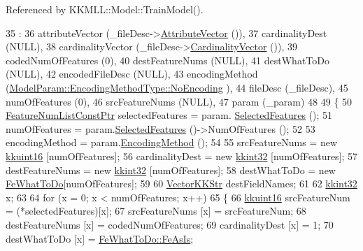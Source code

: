 Referenced by K\+K\+M\+L\+L\+::\+Model\+::\+Train\+Model().


\begin{DoxyCode}
35                                    :
36     attributeVector     (\_fileDesc->\hyperlink{class_k_k_m_l_l_1_1_file_desc_a6dc24b4d315f0c314a4c735d0165798b}{AttributeVector} ()),
37     cardinalityDest     (NULL),
38     cardinalityVector   (\_fileDesc->\hyperlink{class_k_k_m_l_l_1_1_file_desc_a1220ac7417528c460b5c9041275e4c7f}{CardinalityVector} ()),
39     codedNumOfFeatures  (0),
40     destFeatureNums     (NULL),
41     destWhatToDo        (NULL),
42     encodedFileDesc     (NULL),
43     encodingMethod      (\hyperlink{class_k_k_m_l_l_1_1_model_param_a09e49f936f411dba6f08bdaf8d6b4a98a3f6e102acead54bbbf4c704dd88fb94b}{ModelParam::EncodingMethodType::NoEncoding}
      ),
44     fileDesc            (\_fileDesc),
45     numOfFeatures       (0),
46     srcFeatureNums      (NULL),
47     param               (\_param)
48     
49 \{
50   \hyperlink{namespace_k_k_m_l_l_a81284b0a14973267260023f9a72da94a}{FeatureNumListConstPtr}  selectedFeatures = param.
      \hyperlink{class_k_k_m_l_l_1_1_model_param_a99ae86303829d99bd252ccf4c4e672f8}{SelectedFeatures} ();
51   numOfFeatures = param.\hyperlink{class_k_k_m_l_l_1_1_model_param_a99ae86303829d99bd252ccf4c4e672f8}{SelectedFeatures} ()->NumOfFeatures ();
52 
53   encodingMethod   = param.\hyperlink{class_k_k_m_l_l_1_1_model_param_a6c9ed6cff0839bca401fa94ecf3b4558}{EncodingMethod} ();
54 
55   srcFeatureNums   = \textcolor{keyword}{new} \hyperlink{namespace_k_k_b_aa8c7d4d30381c8a0b6fce68974a9c8a9}{kkuint16}  [numOfFeatures];
56   cardinalityDest  = \textcolor{keyword}{new} \hyperlink{namespace_k_k_b_a8fa4952cc84fda1de4bec1fbdd8d5b1b}{kkint32}   [numOfFeatures];
57   destFeatureNums  = \textcolor{keyword}{new} \hyperlink{namespace_k_k_b_a8fa4952cc84fda1de4bec1fbdd8d5b1b}{kkint32}   [numOfFeatures];
58   destWhatToDo     = \textcolor{keyword}{new} \hyperlink{namespace_k_k_m_l_l_aa7a52865d78241e93b30731e46f99b43}{FeWhatToDo}[numOfFeatures];
59 
60   \hyperlink{class_k_k_b_1_1_vector_k_k_str}{VectorKKStr}   destFieldNames;
61 
62   \hyperlink{namespace_k_k_b_a8fa4952cc84fda1de4bec1fbdd8d5b1b}{kkint32}  x;
63 
64   \textcolor{keywordflow}{for}  (x = 0;  x < numOfFeatures;  x++)
65   \{
66     \hyperlink{namespace_k_k_b_aa8c7d4d30381c8a0b6fce68974a9c8a9}{kkuint16}  srcFeatureNum = (*selectedFeatures)[x];
67     srcFeatureNums   [x] = srcFeatureNum;
68     destFeatureNums  [x] = codedNumOfFeatures;
69     cardinalityDest  [x] = 1;
70     destWhatToDo     [x] = \hyperlink{class_k_k_m_l_l_1_1_feature_encoder2_a590f2b852b63095e7347e4cb39d888a7a8fdde05abb9506fd4caa93ddc4490a13}{FeWhatToDo::FeAsIs};

\end{DoxyCode}
